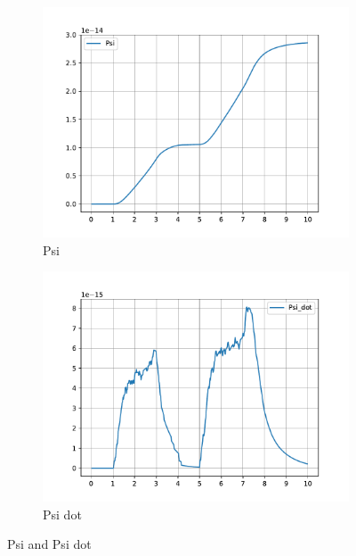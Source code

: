 \begin{figure}[h]
	\centering
	\begin{subfigure}[t]{0.45\textwidth}
		\includegraphics[width=\textwidth]{Psi}
		\caption{Psi}
		\label{fig:Psi}
	\end{subfigure}
	\begin{subfigure}[t]{0.45\textwidth}
		\includegraphics[width=\textwidth]{Psi_dot}
		\caption{Psi dot}
		\label{fig:Psi dot}
	\end{subfigure}
	\caption{Psi and Psi dot}
	\label{fig:Psi and Psi dot}
\end{figure}

